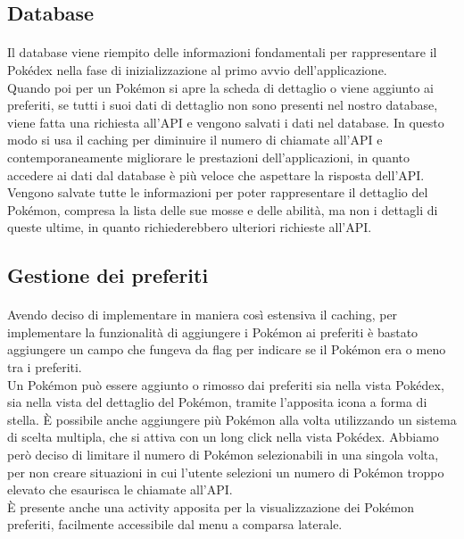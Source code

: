\documentclass[a4paper,11pt]{article}
\begin{document}
				\subsection{Database}
					\paragraph{}
						Il database viene riempito delle informazioni fondamentali per rappresentare il Pokédex nella fase di inizializzazione al primo avvio dell’applicazione.\\
						Quando poi per un Pokémon si apre la scheda di dettaglio o viene aggiunto ai preferiti, se tutti i suoi dati di dettaglio non sono presenti nel nostro database, viene fatta una richiesta all’API e vengono salvati i dati nel database. In questo modo si usa il caching per diminuire il numero di chiamate all’API e contemporaneamente migliorare le prestazioni dell’applicazioni, in quanto accedere ai dati dal database è più veloce che aspettare la risposta dell’API.\\
						Vengono salvate tutte le informazioni per poter rappresentare il dettaglio del Pokémon, compresa la lista delle sue mosse e delle abilità, ma non i dettagli di queste ultime, in quanto richiederebbero ulteriori richieste all’API.\\
				\subsection{Gestione dei preferiti}
					\paragraph{}
						Avendo deciso di implementare in maniera così estensiva il caching, per implementare la funzionalità di aggiungere i Pokémon ai preferiti è bastato aggiungere un campo che fungeva da flag per indicare se il Pokémon era o meno tra i preferiti.\\
						Un Pokémon può essere aggiunto o rimosso dai preferiti sia nella vista Pokédex, sia nella vista del dettaglio del Pokémon, tramite l’apposita icona a forma di stella. È possibile anche aggiungere più Pokémon alla volta utilizzando un sistema di scelta multipla, che si attiva con un long click nella vista Pokédex. Abbiamo però deciso di limitare il numero di Pokémon selezionabili in una singola volta, per non creare situazioni in cui l’utente selezioni un numero di Pokémon troppo elevato che esaurisca le chiamate all’API.\\
						È presente anche una activity apposita per la visualizzazione dei Pokémon preferiti, facilmente accessibile dal menu a comparsa laterale.\\
\end{document}

